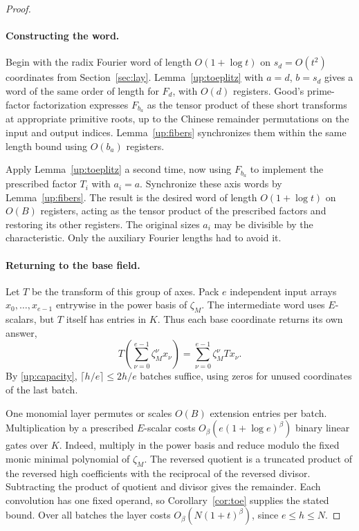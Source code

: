 \begin{proof}
\paragraph{Constructing the word.}
Begin with the radix Fourier word of length \(O(1+\log t)\) on
\(s_d=O(t^2)\) coordinates from Section~\ref{sec:lay}.
Lemma~\ref{up:toeplitz} with \(a=d\), \(b=s_d\) gives a word of the same
order of length for \(F_d\), with \(O(d)\) registers.
Good's prime-factor factorization \cite{Good} expresses \(F_{b_a}\)
as the tensor product of these short transforms at appropriate primitive
roots, up to the Chinese remainder permutations on the input and output
indices. Lemma~\ref{up:fibers} synchronizes them within the same length
bound using \(O(b_a)\) registers.

Apply Lemma~\ref{up:toeplitz} a second time, now using \(F_{b_a}\) to
implement the prescribed factor \(T_i\) with \(a_i=a\). Synchronize these
axis words by Lemma~\ref{up:fibers}. The result is the desired word
of length \(O(1+\log t)\) on \(O(B)\) registers, acting as the tensor
product of the prescribed factors and restoring its other registers.
The original sizes \(a_i\) may be divisible by the characteristic.
Only the auxiliary Fourier lengths had to avoid it.

\paragraph{Returning to the base field.}\label{up:packing}
Let \(T\) be the transform of this group of axes. Pack \(e\) independent
input arrays \(x_0,\ldots,x_{e-1}\) entrywise in the power basis of
\(\zeta_M\). The intermediate word uses \(E\)-scalars, but \(T\) itself
has entries in \(K\). Thus each base coordinate returns its own answer,
\[
       T\left(\sum_{\nu=0}^{e-1}\zeta_M^\nu x_\nu\right)
        =\sum_{\nu=0}^{e-1}\zeta_M^\nu T x_\nu .
\]
By \eqref{up:capacity}, \(\lceil h/e\rceil\le2h/e\) batches suffice,
using zeros for unused coordinates of the last batch.

One monomial layer permutes or scales \(O(B)\) extension entries per
batch. Multiplication by a prescribed \(E\)-scalar costs
\(O_\beta(e(1+\log e)^\beta)\) binary linear gates over \(K\). Indeed,
multiply in the power basis and reduce modulo the fixed monic minimal
polynomial of \(\zeta_M\). The reversed quotient is a truncated product
of the reversed high coefficients with the reciprocal of the reversed
divisor. Subtracting the product of quotient and divisor gives the
remainder. Each convolution has one fixed operand, so
Corollary~\ref{cor:toe} supplies the stated bound. Over all batches
the layer costs \(O_\beta(N(1+t)^\beta)\), since \(e\le h\le N\).


\end{proof}
